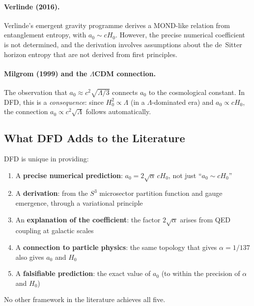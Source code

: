 \documentclass[12pt,a4paper]{article}
\newcommand{\Hzero}{H_0}
\begin{document}
\paragraph{Verlinde (2016).}
Verlinde's emergent gravity programme derives a MOND-like relation from
entanglement entropy, with $a_0 \sim c\Hzero$. However, the precise
numerical coefficient is not determined, and the derivation involves
assumptions about the de~Sitter horizon entropy that are not derived from
first principles.

\paragraph{Milgrom (1999) and the $\Lambda$CDM connection.}
The observation that $a_0 \approx c^2\sqrt{\Lambda/3}$ connects $a_0$
to the cosmological constant. In DFD, this is a \emph{consequence}:
since $\Hzero^2 \propto \Lambda$ (in a $\Lambda$-dominated era) and
$a_0 \propto c\Hzero$, the connection $a_0 \propto c^2\sqrt{\Lambda}$
follows automatically.

\subsection{What DFD Adds to the Literature}

DFD is unique in providing:
\begin{enumerate}
\item A \textbf{precise numerical prediction}: $a_0 = 2\sqrt{\alpha}\,c\Hzero$,
  not just ``$a_0 \sim c\Hzero$''
\item A \textbf{derivation}: from the $S^3$ microsector partition function
  and gauge emergence, through a variational principle
\item An \textbf{explanation of the coefficient}: the factor $2\sqrt{\alpha}$
  arises from QED coupling at galactic scales
\item A \textbf{connection to particle physics}: the same topology that gives
  $\alpha = 1/137$ also gives $a_0$ and $\Hzero$
\item A \textbf{falsifiable prediction}: the exact value of $a_0$
  (to within the precision of $\alpha$ and $\Hzero$)
\end{enumerate}

No other framework in the literature achieves all five.


\end{document}
